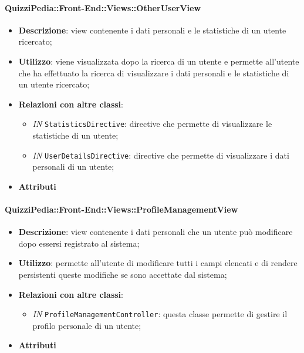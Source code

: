 \paragraph{QuizziPedia::Front-End::Views::OtherUserView}
\begin{itemize}
	\item \textbf{Descrizione}: view contenente i dati personali e le statistiche di un utente ricercato;
	\item \textbf{Utilizzo}: viene visualizzata dopo la ricerca di un utente e permette all'utente che ha effettuato la ricerca di visualizzare i dati personali e le statistiche di un utente ricercato;
	\item \textbf{Relazioni con altre classi}:
	\begin{itemize}
		\item \textit{IN} \texttt{StatisticsDirective}: directive che permette di visualizzare le statistiche di un utente;
		\item \textit{IN} \texttt{UserDetailsDirective}: directive che permette di visualizzare i dati personali di un utente;
	\end{itemize}
	\item \textbf{Attributi}
\end{itemize}

\paragraph{QuizziPedia::Front-End::Views::ProfileManagementView}
\begin{itemize}
	\item \textbf{Descrizione}: view contenente i dati personali che un utente può modificare dopo essersi registrato al sistema;
	\item \textbf{Utilizzo}: permette all'utente di modificare tutti i campi elencati e di rendere persistenti queste modifiche se sono accettate dal sistema;
	\item \textbf{Relazioni con altre classi}:
	\begin{itemize}
		\item \textit{IN} \texttt{ProfileManagementController}: questa classe permette di gestire il profilo personale di un utente;
	\end{itemize}
	\item \textbf{Attributi}
\end{itemize}

